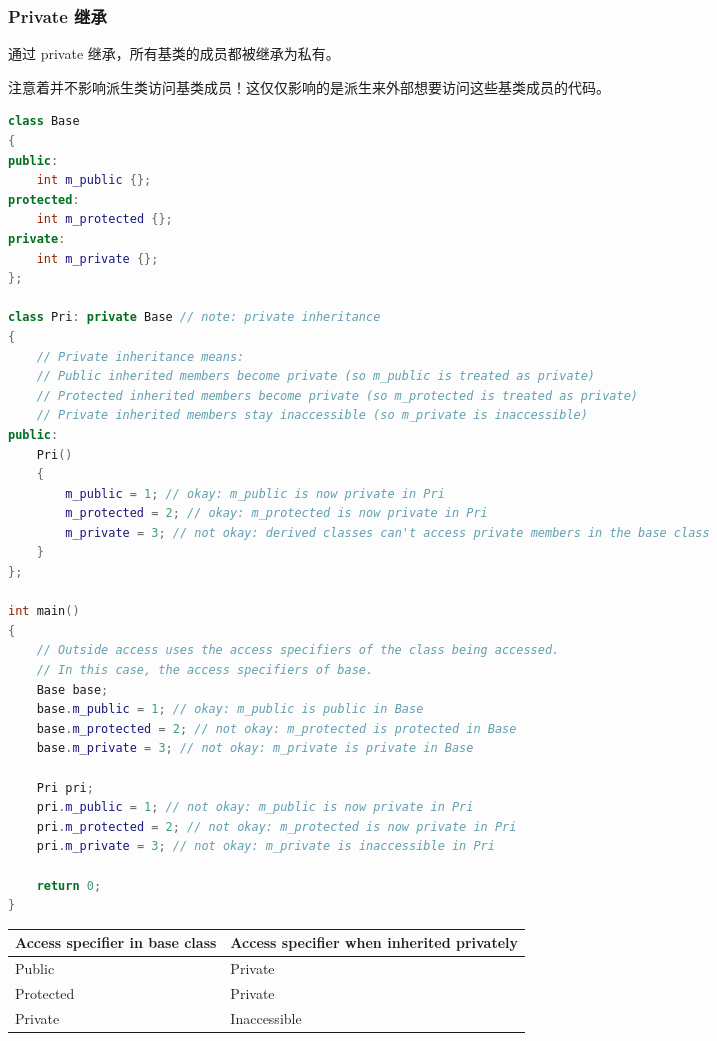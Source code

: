 \documentclass[../../LearnCpp.tex]{subfiles}
\begin{document}
\subsubsection*{Private 继承}

通过 private 继承，所有基类的成员都被继承为私有。

注意着并不影响派生类访问基类成员！这仅仅影响的是派生来外部想要访问这些基类成员的代码。

\begin{lstlisting}[language=C++]
class Base
{
public:
    int m_public {};
protected:
    int m_protected {};
private:
    int m_private {};
};

class Pri: private Base // note: private inheritance
{
    // Private inheritance means:
    // Public inherited members become private (so m_public is treated as private)
    // Protected inherited members become private (so m_protected is treated as private)
    // Private inherited members stay inaccessible (so m_private is inaccessible)
public:
    Pri()
    {
        m_public = 1; // okay: m_public is now private in Pri
        m_protected = 2; // okay: m_protected is now private in Pri
        m_private = 3; // not okay: derived classes can't access private members in the base class
    }
};

int main()
{
    // Outside access uses the access specifiers of the class being accessed.
    // In this case, the access specifiers of base.
    Base base;
    base.m_public = 1; // okay: m_public is public in Base
    base.m_protected = 2; // not okay: m_protected is protected in Base
    base.m_private = 3; // not okay: m_private is private in Base

    Pri pri;
    pri.m_public = 1; // not okay: m_public is now private in Pri
    pri.m_protected = 2; // not okay: m_protected is now private in Pri
    pri.m_private = 3; // not okay: m_private is inaccessible in Pri

    return 0;
}
\end{lstlisting}

\begin{center}
    \begin{tiny}
        \begin{tabularx}{ 1\textwidth}{
                | >{\raggedright\arraybackslash}X
                | >{\raggedright\arraybackslash}X |
            }
            \hline
            Access specifier in base class & Access specifier when inherited privately \\
            \hline
            Public                         & Private                                   \\
            Protected                      & Private                                   \\
            Private                        & Inaccessible                              \\
            \hline
        \end{tabularx}
    \end{tiny}
\end{center}
\end{document}
